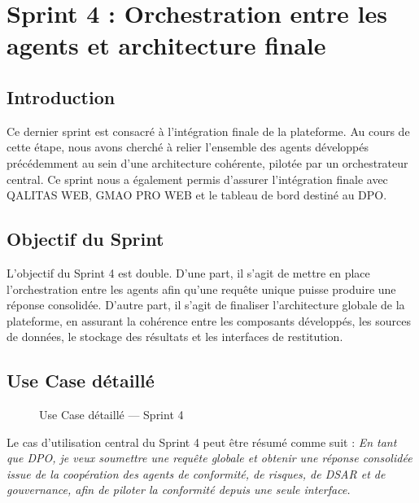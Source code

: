 \documentclass[12pt,a4paper]{report}
\begin{document}
\chapter{Sprint 4 : Orchestration entre les agents et architecture finale}

\section{Introduction}

Ce dernier sprint est consacré à l'intégration finale de la plateforme. Au cours de cette étape, nous avons cherché à relier l'ensemble des agents développés précédemment au sein d'une architecture cohérente, pilotée par un orchestrateur central. Ce sprint nous a également permis d'assurer l'intégration finale avec QALITAS WEB, GMAO PRO WEB et le tableau de bord destiné au DPO.

\section{Objectif du Sprint}

L'objectif du Sprint 4 est double. D'une part, il s'agit de mettre en place l'orchestration entre les agents afin qu'une requête unique puisse produire une réponse consolidée. D'autre part, il s'agit de finaliser l'architecture globale de la plateforme, en assurant la cohérence entre les composants développés, les sources de données, le stockage des résultats et les interfaces de restitution.

\section{Use Case détaillé}

\begin{figure}[H]
\centering
{}
\caption{Use Case détaillé --- Sprint 4}
\label{fig:use_case_sprint4}
\end{figure}

Le cas d'utilisation central du Sprint 4 peut être résumé comme suit : \textit{En tant que DPO, je veux soumettre une requête globale et obtenir une réponse consolidée issue de la coopération des agents de conformité, de risques, de DSAR et de gouvernance, afin de piloter la conformité depuis une seule interface.}
\end{document}
